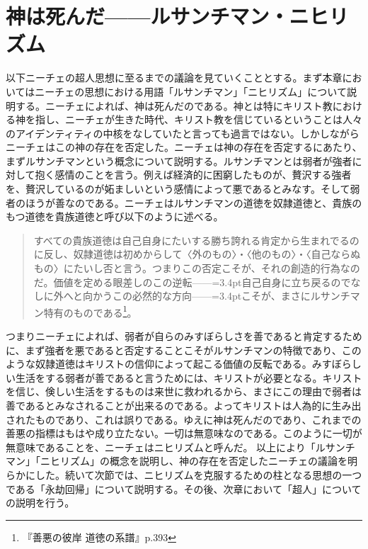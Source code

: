 \documentclass[b5j,twoside,twocolumn]{utarticle}
\begin{document}
\section{神は死んだ\tbaselineshift=4.0pt------ルサンチマン・ニヒリズム}
以下ニーチェの超人思想に至るまでの議論を見ていくこととする。まず本章においてはニーチェの思想における用語「ルサンチマン」「ニヒリズム」について説明する。ニーチェによれば、神は死んだのである。神とは特にキリスト教における神を指し、ニーチェが生きた時代、キリスト教を信じているということは人々のアイデンティティの中核をなしていたと言っても過言ではない。しかしながらニーチェはこの神の存在を否定した。ニーチェは神の存在を否定するにあたり、まずルサンチマンという概念について説明する。ルサンチマンとは弱者が強者に対して抱く感情のことを言う。例えば経済的に困窮したものが、贅沢する強者を、贅沢しているのが妬ましいという感情によって悪であるとみなす。そして弱者のほうが善なのである。ニーチェはルサンチマンの道徳を奴隷道徳と、貴族のもつ道徳を貴族道徳と呼び以下のように述べる。
\begin{quote}
すべての貴族道徳は自己自身にたいする勝ち誇れる肯定から生まれでるのに反し、奴隷道徳は初めからして〈外のもの〉・〈他のもの〉・〈自己ならぬもの〉にたいし否と言う。つまりこの否定こそが、それの創造的行為なのだ。価値を定める眼差しのこの逆転\tbaselineshift=2.5pt------\tbaselineshift=3.4pt自己自身に立ち戻るのでなしに外へと向かうこの必然的な方向\tbaselineshift=2.5pt------\tbaselineshift=3.4ptこそが、まさにルサンチマン特有のものである\footnote{『善悪の彼岸 道徳の系譜』p.393}。
\end{quote}


つまりニーチェによれば、弱者が自らのみすぼらしさを善であると肯定するために、まず強者を悪であると否定することこそがルサンチマンの特徴であり、このような奴隷道徳はキリストの信仰によって起こる価値の反転である。みすぼらしい生活をする弱者が善であると言うためには、キリストが必要となる。キリストを信じ、倹しい生活をするものは来世に救われるから、まさにこの理由で弱者は善であるとみなされることが出来るのである。よってキリストは人為的に生み出されたものであり、これは誤りである。ゆえに神は死んだのであり、これまでの善悪の指標はもはや成り立たない。一切は無意味なのである。このように一切が無意味であることを、ニーチェはニヒリズムと呼んだ。
以上により「ルサンチマン」「ニヒリズム」の概念を説明し、神の存在を否定したニーチェの議論を明らかにした。続いて次節では、ニヒリズムを克服するための柱となる思想の一つである「永劫回帰」について説明する。その後、次章において「超人」についての説明を行う。%
\end{document}
